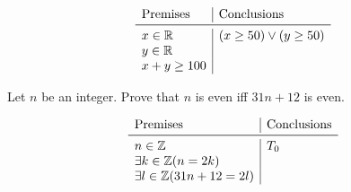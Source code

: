 \documentclass{article}
\begin{document}
\[
\begin{array}{l|l}
\text{Premises} & \text{Conclusions} \\
\midrule
x\in\mathbb{R} & (x\ge 50)\vee(y\ge 50) \\
y\in\mathbb{R} & \\
x+y\ge 100 & \\
\end{array}
\]

Let $n$ be an integer. Prove that $n$ is even iff $31n+12$ is even.

\[
\begin{array}{l|l}
\text{Premises} & \text{Conclusions} \\
\midrule
n\in\mathbb{Z} & T_0 \\
\exists k\in\mathbb{Z}(n=2k) & \\
\exists l\in\mathbb{Z}(31n+12=2l) & \\
\end{array}
\]
\end{document}
